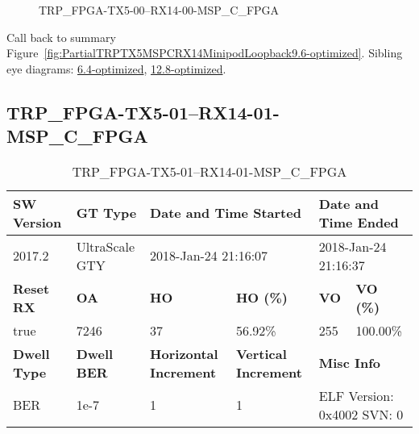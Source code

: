 \begin{figure}[h]
\caption{TRP\_FPGA-TX5-00--RX14-00-MSP\_C\_FPGA} \label{fig:TRPFPGATX500RX1400MSPCFPGA9.6-optimized}
\end{figure}

Call back to summary Figure~\ref{fig:PartialTRPTX5MSPCRX14MinipodLoopback9.6-optimized}.
Sibling eye diagrams: \hyperref[sec:TRPFPGATX500RX1400MSPCFPGA6.4-optimized]{6.4-optimized}, \hyperref[sec:TRPFPGATX500RX1400MSPCFPGA12.8-optimized]{12.8-optimized}.

\clearpage
\newpage


\subsection{TRP\_FPGA-TX5-01--RX14-01-MSP\_C\_FPGA}\label{sec:TRPFPGATX501RX1401MSPCFPGA9.6-optimized}

\begin{table}[h]
\centering
\caption{TRP\_FPGA-TX5-01--RX14-01-MSP\_C\_FPGA}
\label{tab:TRPFPGATX501RX1401MSPCFPGA9.6-optimized}
\begin{tabular}{@{}|l|l|l|l|l|l|@{}}
\toprule
\textbf{SW Version}                & \textbf{GT Type}   & \multicolumn{2}{l|}{\textbf{Date and Time Started}}            & \multicolumn{2}{l|}{\textbf{Date and Time Ended}}        \\ \midrule
2017.2                       & UltraScale GTY          & \multicolumn{2}{l|}{2018-Jan-24 21:16:07}                   & \multicolumn{2}{l|}{2018-Jan-24 21:16:37}               \\ \midrule
\textbf{Reset RX}                  & \textbf{OA} & \textbf{HO}   & \textbf{HO (\%)} & \textbf{VO} & \textbf{VO (\%)} \\ \midrule
true & 7246        & 37          & 56.92\%        & 255        & 100.00\%       \\ \midrule
\textbf{Dwell Type}                & \textbf{Dwell BER} & \textbf{Horizontal Increment} & \textbf{Vertical Increment}    & \multicolumn{2}{l|}{\textbf{Misc Info}}                  \\ \midrule
BER                            & 1e-7        & 1        & 1           & \multicolumn{2}{l|}{ELF Version: 0x4002 SVN: 0}                         \\ \bottomrule
\end{tabular}
\end{table}

